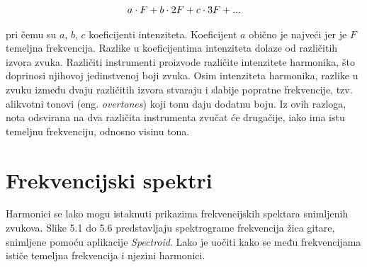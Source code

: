 \documentclass[times, utf8, diplomski, numeric]{fer}
\begin{document}
\begin{equation}
	a \cdot F + b \cdot 2F + c \cdot 3F + ...\\
\end{equation}

pri čemu su $a$, $b$, $c$ koeficijenti intenziteta. Koeficijent $a$ obično je najveći jer je $F$ temeljna frekvencija. Razlike u koeficijentima intenziteta dolaze od različitih izvora zvuka. Različiti instrumenti proizvode različite intenzitete harmonika, što doprinosi njihovoj jedinstvenoj boji zvuka. Osim intenziteta harmonika, razlike u zvuku između dvaju različitih izvora stvaraju i slabije popratne frekvencije, tzv. alikvotni tonovi (eng. \textit{overtones}) koji tonu daju dodatnu boju.\cite{christensen1987science} Iz ovih razloga, nota odsvirana na dva različita instrumenta zvučat će drugačije, iako ima istu temeljnu frekvenciju, odnosno visinu tona.

\section{Frekvencijski spektri}
Harmonici se lako mogu istaknuti prikazima frekvencijskih spektara snimljenih zvukova. Slike 5.1 do 5.6 predstavljaju spektrograme frekvencija žica gitare, snimljene pomoću aplikacije \textit{Spectroid}\cite{reinke_2018}\thinspace. Lako je uočiti kako se među frekvencijama ističe temeljna frekvencija i njezini harmonici.

\clearpage
\end{document}
